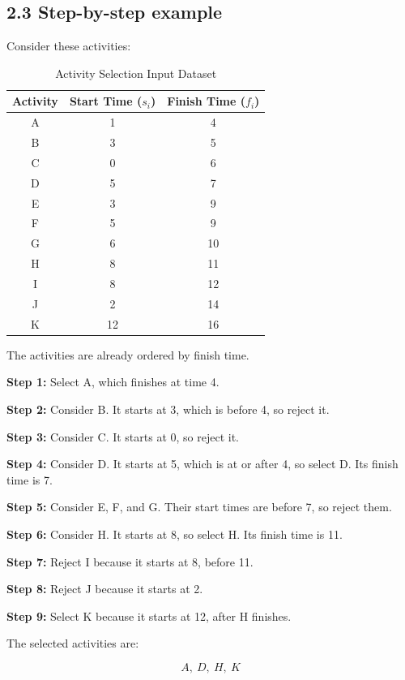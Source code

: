 \subsection{2.3 Step-by-step example}

Consider these activities:

\begin{table}[htbp]
\centering
\caption{Activity Selection Input Dataset}
\label{tab:activity_selection_data}
\begin{tabular}{ccc}
\toprule
\textbf{Activity} & \textbf{Start Time ($s_i$)} & \textbf{Finish Time ($f_i$)} \\
\midrule
A & 1 & 4 \\
B & 3 & 5 \\
C & 0 & 6 \\
D & 5 & 7 \\
E & 3 & 9 \\
F & 5 & 9 \\
G & 6 & 10 \\
H & 8 & 11 \\
I & 8 & 12 \\
J & 2 & 14 \\
K & 12 & 16 \\
\bottomrule
\end{tabular}
\end{table}

The activities are already ordered by finish time.

\textbf{Step 1:} Select A, which finishes at time 4.

\textbf{Step 2:} Consider B. It starts at 3, which is before 4, so reject it.

\textbf{Step 3:} Consider C. It starts at 0, so reject it.

\textbf{Step 4:} Consider D. It starts at 5, which is at or after 4, so select D. Its finish time is 7.

\textbf{Step 5:} Consider E, F, and G. Their start times are before 7, so reject them.

\textbf{Step 6:} Consider H. It starts at 8, so select H. Its finish time is 11.

\textbf{Step 7:} Reject I because it starts at 8, before 11.

\textbf{Step 8:} Reject J because it starts at 2.

\textbf{Step 9:} Select K because it starts at 12, after H finishes.

The selected activities are:


\[
\boxed{A,\ D,\ H,\ K}
\]


